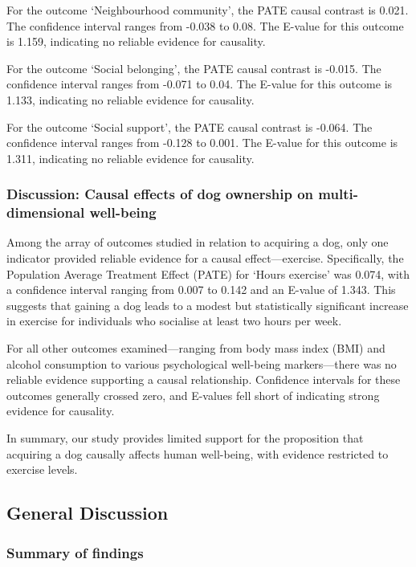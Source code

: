 \documentclass[
  singlecolumn,
  9pt]{article}
\begin{document}
For the outcome `Neighbourhood community', the PATE causal contrast is
0.021. The confidence interval ranges from -0.038 to 0.08. The E-value
for this outcome is 1.159, indicating no reliable evidence for
causality.

For the outcome `Social belonging', the PATE causal contrast is -0.015.
The confidence interval ranges from -0.071 to 0.04. The E-value for this
outcome is 1.133, indicating no reliable evidence for causality.

For the outcome `Social support', the PATE causal contrast is -0.064.
The confidence interval ranges from -0.128 to 0.001. The E-value for
this outcome is 1.311, indicating no reliable evidence for causality.

\subsubsection{Discussion: Causal effects of dog ownership on
multi-dimensional
well-being}\label{discussion-causal-effects-of-dog-ownership-on-multi-dimensional-well-being}

Among the array of outcomes studied in relation to acquiring a dog, only
one indicator provided reliable evidence for a causal effect---exercise.
Specifically, the Population Average Treatment Effect (PATE) for `Hours
exercise' was 0.074, with a confidence interval ranging from 0.007 to
0.142 and an E-value of 1.343. This suggests that gaining a dog leads to
a modest but statistically significant increase in exercise for
individuals who socialise at least two hours per week.

For all other outcomes examined---ranging from body mass index (BMI) and
alcohol consumption to various psychological well-being markers---there
was no reliable evidence supporting a causal relationship. Confidence
intervals for these outcomes generally crossed zero, and E-values fell
short of indicating strong evidence for causality.

In summary, our study provides limited support for the proposition that
acquiring a dog causally affects human well-being, with evidence
restricted to exercise levels.

\subsection{General Discussion}\label{general-discussion}

\subsubsection{Summary of findings}\label{summary-of-findings}
\end{document}

